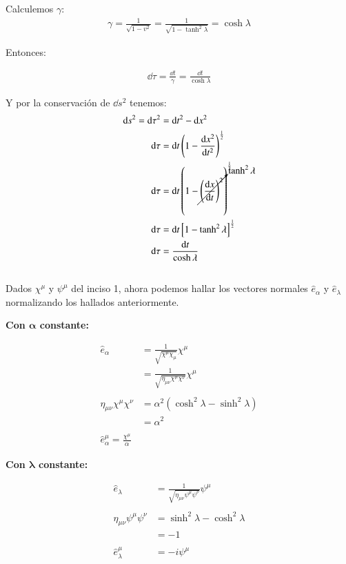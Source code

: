 Calculemos $\gamma$:
\begin{align*}
    \gamma = \frac{1}{\sqrt{1-v^2}} = \frac{1}{\sqrt{1-\tanh^2\lambda}} = \cosh\lambda
\end{align*}

Entonces:

\begin{align*}
    \dd \tau = \frac{\dd t}{\gamma} = \frac{\dd t}{\cosh\lambda}
\end{align*}

Y por la conservación de $\dd s^2$ tenemos:
\begin{align*}
    \dd s^2=\dd \tau^2 &= \dd t^2 - \dd x^2\\
    \dd \tau &= \dd t \left(1-\frac{\dd x^2}{\dd t^2}\right)^{\frac{1}{2}}\\
    \dd \tau &= \dd t \left(1-\cancelto{\tanh^2\lambda}{\left(\frac{\dd x}{\dd t}\right)^2}\right)^{\frac{1}{2}}\\
    \dd \tau &= \dd t \left[1-\tanh^2\lambda\right]^{\frac{1}{2}}\\
    \dd \tau &= \frac{\dd t}{\cosh\lambda}
\end{align*}



\subsection{}

Dados $\chi^\mu$ y $\psi^\mu$ del inciso 1, ahora podemos hallar los vectores normales $\hat{e}_\alpha$ y $\hat{e}_\lambda$ normalizando los hallados anteriormente.

\textbf{Con $\mathbf{\alpha}$ constante:}

\begin{align*}
    \hat{e}_\alpha &= \frac{1}{\sqrt{\chi^\mu\chi_\mu}}\chi^\mu\\
    &= \frac{1}{\sqrt{\eta_{\mu\nu}\chi^\mu\chi^\nu}}\chi^\mu\\\\
    \eta_{\mu\nu}\chi^\mu\chi^\nu &= \alpha^2(\cosh^2\lambda-\sinh^2\lambda)\\
    &=\alpha^2\\\\
    \hat{e}_\alpha^\mu = \frac{\chi^\mu}{\alpha}
\end{align*}

\textbf{Con $\mathbf{\lambda}$ constante:}

\begin{align*}
    \hat{e}_\lambda &= \frac{1}{\sqrt{\eta_{\mu\nu}\psi^{\mu}\psi^{\nu}}}\psi^\mu\\\\
    \eta_{\mu\nu}\psi^{\mu}\psi^{\nu}&=\sinh^2\lambda - \cosh^2\lambda\\
    &=-1\\\\
    \hat{e}_\lambda^\mu &= -i\psi^\mu
\end{align*}


